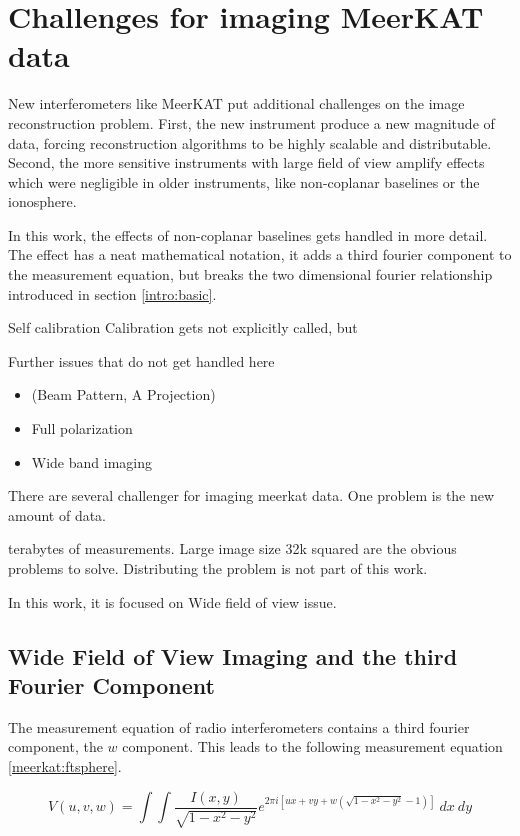 \section{Challenges for imaging MeerKAT data} \label{meerkat}
New interferometers like MeerKAT put additional challenges on the image reconstruction problem. First, the new instrument produce a new magnitude of data, forcing reconstruction algorithms to be highly scalable and distributable. Second, the more sensitive instruments with large field of view amplify effects which were negligible in older instruments, like non-coplanar baselines or the ionosphere.

In this work, the effects of non-coplanar baselines gets handled in more detail. The effect has a neat mathematical notation, it adds a third fourier component to the measurement equation, but breaks the two dimensional fourier relationship introduced in section \ref{intro:basic}. 


Self calibration Calibration gets not explicitly called, but 

Further issues that do not get handled here
\begin{itemize}
	\item (Beam Pattern, A Projection)
	\item Full polarization
	\item Wide band imaging
\end{itemize}

There are several challenger for imaging meerkat data. One problem is the new amount of data.

terabytes of measurements. Large image size 32k squared are the obvious problems to solve. Distributing the problem is not part of this work.

 In this work, it is focused on Wide field of view issue. 







\subsection{Wide Field of View Imaging and the third Fourier Component} \label{meerkat:wof}
The measurement equation of radio interferometers contains a third fourier component, the $w$ component. This leads to the following measurement equation \eqref{meerkat:ftsphere}.

\begin{equation}\label{meerkat:ftsphere}
V(u, v, w) = \int\int \frac{I(x, y)}{\sqrt{1 - x^2 - y ^2}} e^{2 \pi i [ux+vy+ w(\sqrt{1 - x^2 - y ^2} - 1)]} \: dx \: dy
\end{equation}

